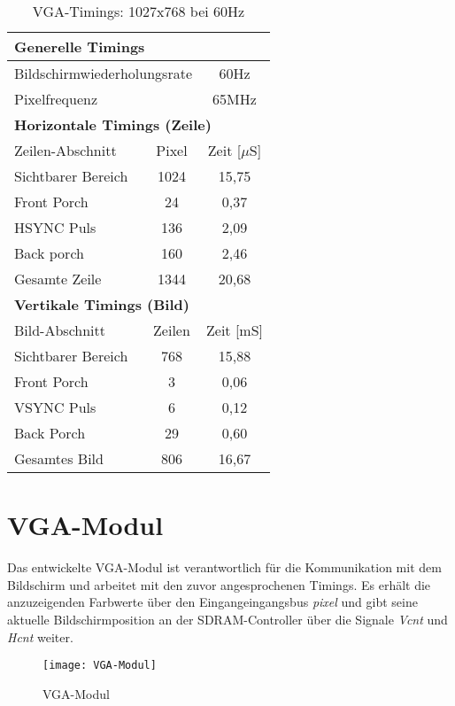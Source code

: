 \begin{table}[h!]
\caption{VGA-Timings: 1027x768 bei 60Hz}
\label{tab:VGA}
\centering
\setlength{\tabcolsep}{5mm}	%
\def\arraystretch{1.25}			%
\begin{tabular}{|l|c|c|}
\hline
\multicolumn{3}{|l|}{\textbf{Generelle Timings}} \\
\hline\hline
\multicolumn{2}{|l|}{Bildschirmwiederholungsrate} & 60Hz \\  
\hline 
\multicolumn{2}{|l|}{Pixelfrequenz} & 65MHz \\ 
\hline \hline
\multicolumn{3}{|l|}{\textbf{Horizontale Timings (Zeile)}} \\ 
\hline \hline
Zeilen-Abschnitt & Pixel & Zeit [$\mu$S] \\ 
\hline 
Sichtbarer Bereich & 1024 & 15,75 \\ 
\hline 
Front Porch & 24 & 0,37 \\ 
\hline 
HSYNC Puls & 136 & 2,09 \\ 
\hline 
Back porch & 160 & 2,46 \\ 
\hline 
Gesamte Zeile & 1344 & 20,68 \\ 
\hline \hline
\multicolumn{3}{|l|}{\textbf{Vertikale Timings (Bild)}} \\ 
\hline \hline
Bild-Abschnitt & Zeilen & Zeit [mS]\\ 
\hline 
Sichtbarer Bereich & 768 & 15,88 \\ 
\hline 
Front Porch & 3 & 0,06 \\ 
\hline 
VSYNC Puls & 6 & 0,12 \\ 
\hline 
Back Porch & 29 & 0,60 \\ 
\hline 
Gesamtes Bild & 806 & 16,67 \\ 
\hline 
\end{tabular}
\end{table} 
\FloatBarrier


\section{VGA-Modul}
Das entwickelte VGA-Modul ist verantwortlich für die Kommunikation mit dem Bildschirm und arbeitet mit den zuvor angesprochenen Timings. Es erhält die anzuzeigenden Farbwerte über den Eingangeingangsbus \emph{pixel} und gibt seine aktuelle Bildschirmposition an der SDRAM-Controller über die Signale \emph{Vcnt} und \emph{Hcnt} weiter.
%
\begin{figure}[h!]
\centering
\texttt{[image: VGA-Modul]} %
\caption{VGA-Modul}
\label{fig:VGA-M}
\end{figure}
%
